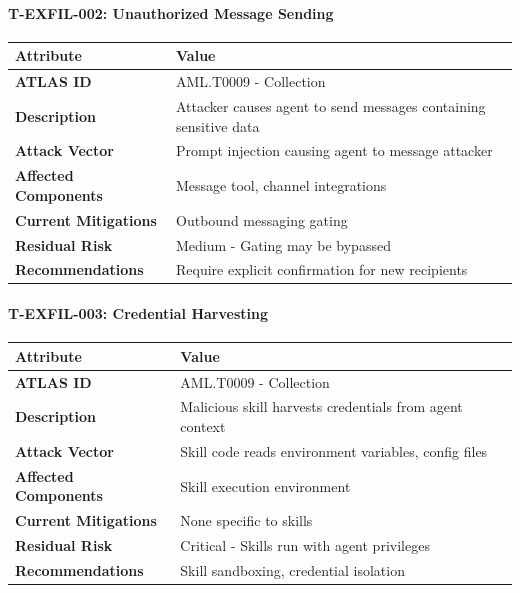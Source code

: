 \paragraph{T-EXFIL-002: Unauthorized Message Sending}



\begin{table}[h]
\centering
\small
\begin{tabular}{|l|l|}
\hline
Attribute & Value \\
\hline
\textbf{ATLAS ID} & AML.T0009 - Collection \\
\hline
\textbf{Description} & Attacker causes agent to send messages containing sensitive data \\
\hline
\textbf{Attack Vector} & Prompt injection causing agent to message attacker \\
\hline
\textbf{Affected Components} & Message tool, channel integrations \\
\hline
\textbf{Current Mitigations} & Outbound messaging gating \\
\hline
\textbf{Residual Risk} & Medium - Gating may be bypassed \\
\hline
\textbf{Recommendations} & Require explicit confirmation for new recipients \\
\hline
\end{tabular}
\end{table}



\paragraph{T-EXFIL-003: Credential Harvesting}



\begin{table}[h]
\centering
\small
\begin{tabular}{|l|l|}
\hline
Attribute & Value \\
\hline
\textbf{ATLAS ID} & AML.T0009 - Collection \\
\hline
\textbf{Description} & Malicious skill harvests credentials from agent context \\
\hline
\textbf{Attack Vector} & Skill code reads environment variables, config files \\
\hline
\textbf{Affected Components} & Skill execution environment \\
\hline
\textbf{Current Mitigations} & None specific to skills \\
\hline
\textbf{Residual Risk} & Critical - Skills run with agent privileges \\
\hline
\textbf{Recommendations} & Skill sandboxing, credential isolation \\
\hline
\end{tabular}
\end{table}



